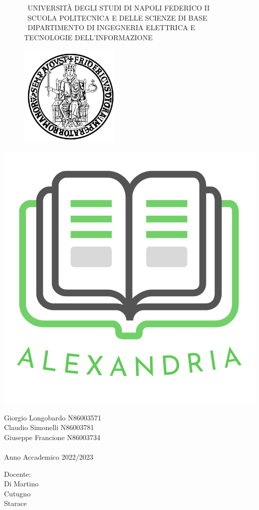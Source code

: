 \documentclass{report}
\begin{document}
    \begin{figure}[htbp!]
    

    \centering\scshape\Medium\ UNIVERSITÀ DEGLI STUDI DI NAPOLI FEDERICO II \\
    \centering\scshape\small\ SCUOLA POLITECNICA E DELLE SCIENZE DI BASE\\
    \centering\scshape\Medium\ DIPARTIMENTO DI INGEGNERIA ELETTRICA E TECNOLOGIE DELL'INFORMAZIONE\\

        \begin{center}
            \includegraphics[width=.30\textwidth]{Immagini/FedericoII.png}
        \end{center}
    \end{figure}
         \begin{center}

            \includegraphics[width=.30\textwidth]{Immagini/Alexandria logo nome medium 2.png} 
        \end{center}
        

    \begin{center}


        Giorgio Longobardo N86003571 \\ Claudio Simonelli N86003781\\ Giuseppe Francione N86003734\\~\\ Anno Accademico 2022/2023
    \end{center}
    
\hspace{0pt}
\vfill
    \raggedleft Docente:\\Di Martino\\Cutugno\\Starace
\vfill
\hspace{0pt}


    
    \newpage

    \tableofcontents

    
    
    
    \printglossary
    
    
    

    
\end{document}
